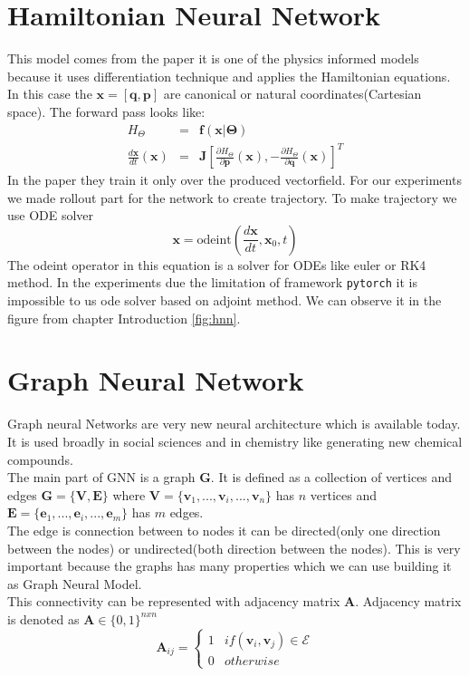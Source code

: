 \section{Hamiltonian Neural Network}
This model comes from the paper \cite{hnn} it is one of the physics informed models because it uses differentiation technique and applies the Hamiltonian equations. In this case the $\mathbf{x} = [\mathbf{q},\mathbf{p}]$ are canonical or natural coordinates(Cartesian space).
The forward pass looks like:
\begin{eqnarray}
	H_{\Theta} &=& \mathbf{f}(\mathbf{x}|\boldsymbol{\Theta})\\
	\frac{d\mathbf{x}}{dt}(\mathbf{x}) &=& \mathbf{J}\left[\frac{\partial H_{\Theta}}{\partial\mathbf{p}}(\mathbf{x}),-\frac{\partial H_{\Theta}}{\partial\mathbf{q}}(\mathbf{x})\right]^T
\end{eqnarray}
In the paper they train it only over the produced vectorfield.
For our experiments we made rollout part for the network to create trajectory. 
To make trajectory we use ODE solver
\begin{equation}
	\mathbf{x} = \text{odeint}\left(\frac{d\mathbf{x}}{dt},\mathbf{x}_0,t\right)
\end{equation} 
The odeint operator in this equation is a solver for ODEs like euler or RK4 method. In the experiments due the limitation of framework \texttt{pytorch} it is impossible to us ode solver based on adjoint method. We can observe it in the figure from chapter Introduction \ref{fig:hnn}.\\
\section{Graph Neural Network}
Graph neural Networks are very new neural architecture which is available today. It is used broadly in social sciences and in chemistry like generating new chemical compounds.\\
The main part of GNN is a graph $\mathbf{G}$. It is defined as a collection of vertices and edges $\mathbf{G}=\{\mathbf{V},\mathbf{E}\}$ where $\mathbf{V} = \{\mathbf{v}_1,...,\mathbf{v}_i,...,\mathbf{v}_n\}$ has $n$ vertices
and $\mathbf{E} = \{\mathbf{e}_1,...,\mathbf{e}_i,...,\mathbf{e}_m\}$
has $m$ edges.\\
The edge is connection between to nodes it can be directed(only one direction between the nodes) or undirected(both direction between the nodes). This is very important because the graphs has many properties which we can use building it as Graph Neural Model.\\
This connectivity can be represented with adjacency matrix $\mathbf{A}$.
Adjacency matrix is denoted as $\mathbf{A}\in \{0,1\}^{n x n}$ 
\begin{equation}
\mathbf{A}_{ij} =	\left\{\begin{matrix}
		1 & if (\mathbf{v}_i , \mathbf{v}_j)\in\mathcal{E}\\
		0 & otherwise
	\end{matrix}\right.
\end{equation}

